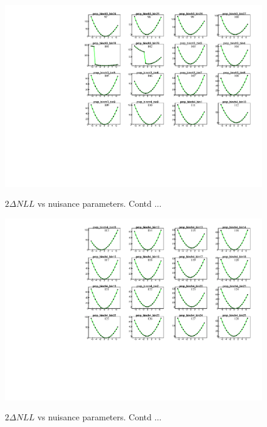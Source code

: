 \begin{figure}
    \centering  
    {\includegraphics[width=1.0\linewidth]{Image/MLFit/ScanNuis/scanNuis7.pdf}}
    \caption{  $2\Delta NLL$ vs nuisance parameters. Contd ...}
    \label{fig:nuisScan7}
\end{figure}
\begin{figure}
    \centering  
    {\includegraphics[width=1.0\linewidth]{Image/MLFit/ScanNuis/scanNuis8.pdf}}
    \caption{  $2\Delta NLL$ vs nuisance parameters. Contd ...}
    \label{fig:nuisScan8}
\end{figure}
